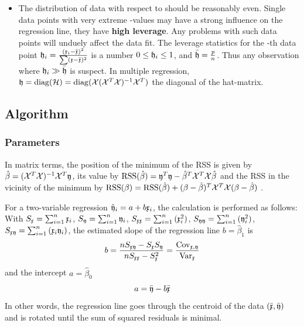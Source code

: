 \begin{refsection}
\begin{itemize}
  \item{The distribution of data with respect to  should be reasonably even. Single data points with very extreme -values may have a strong influence on the regression line, they have \textbf{high leverage}. Any problems with such data points will unduely affect the data fit. The leverage statistics for the -th data point \(\mathfrak{h}_i = \frac{(\mathfrak{x}_i - \bar{\mathfrak{x}})^2}{\sum(\mathfrak{x} - \bar{\mathfrak{x}})^2} \) is a number \(0 \leq \mathfrak{h}_i \leq 1 \), and \(\bar{\mathfrak{h}} = \frac{p}{n} \). Thus any observation where \(\mathfrak{h}_i \gg \bar{\mathfrak{h}} \) is suspect. In multiple regression, \(\mathfrak{h} = \operatorname{diag}(\mathcal{H}) = \operatorname{diag}(\mathcal{X}(\mathcal{X}^T\mathcal{X})^{-1}\mathcal{X}^T) \) the diagonal of the hat-matrix.   }
\end{itemize}

\subsection{Algorithm}

\subsubsection{Parameters}

In matrix terms, the position of the minimum of the \acs{RSS} is given by \( \hat{\beta} = (\mathcal{X}^T \mathcal{X})^{-1} \mathcal{X}^T\mathfrak{y} \), its value by \( \mathrm{RSS}(\hat{\beta}) = \mathfrak{y}^T\mathfrak{y} - \hat{\beta}^T \mathcal{X}^T \mathcal{X} \hat{\beta} \) and the \acs{RSS} in the vicinity of the minimum by \( \mathrm{RSS}(\beta) = \mathrm{RSS}(\hat{\beta}) + (\beta - \hat{\beta})^T \mathcal{X}^T\mathcal{X}(\beta - \hat{\beta}) \) \parencite{Joh-10b}.

For a two-variable regression \( \hat{\mathfrak{y}}_i = a + b\mathfrak{x}_i \), the calculation is performed as follows:  With \(S_{\mathfrak{x}} = \sum_{i=1}^n{\mathfrak{x}_i} \), \(S_{\mathfrak{y}} = \sum_{i=1}^n{\mathfrak{y}_i} \), \(S_{\mathfrak{xx}} = \sum_{i=1}^n{(\mathfrak{x}_i^2)} \), \(S_{\mathfrak{yy}} = \sum_{i=1}^n{(\mathfrak{y}_i^2)} \), \(S_{\mathfrak{xy}} = \sum_{i=1}^n{(\mathfrak{x}_i\mathfrak{y}_i)} \), the estimated slope of the regression line \(b = \hat{\beta}_1 \) is
\begin{equation}
  b = \frac{n S_{\mathfrak{xy}} - S_{\mathfrak{x}}S_{\mathfrak{y}}}{n S_{\mathfrak{xx}} - S_{\mathfrak{x}}^2}
    = \frac{\mathrm{Cov}_{\mathfrak{x,y}}}{\mathrm{Var}_{\mathfrak{x}}}
\end{equation}
and the intercept \(a = \hat{\beta}_0 \)
\begin{equation}
  a = \bar{\mathfrak{y}} - b\bar{\mathfrak{x}}
\end{equation}
In other words, the regression line goes through the centroid of the data \((\bar{\mathfrak{x}}, \bar{\mathfrak{y}}) \) and is rotated until the sum of squared residuals is minimal.


\end{refsection}
